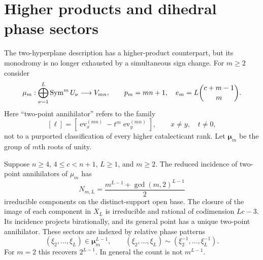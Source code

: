 \section{Higher products and dihedral phase sectors}\label{sec:higher-products}
The two-hyperplane description has a higher-product counterpart, but
its monodromy is no longer exhausted by a simultaneous sign change.
For $m\ge2$ consider
\[
 \mu_m:\bigoplus_{\nu=1}^L\operatorname{Sym}^mU_\nu\longrightarrow V_{mn},
 \qquad p_m=mn+1,\quad e_m=L\binom{c+m-1}{m}.
\]
Here ``two-point annihilator'' refers to the family
\[
 [\ell]=[\operatorname{ev}_x^{(mn)}-t^m\operatorname{ev}_y^{(mn)}],
 \qquad x\ne y,\quad t\ne0,
\]
not to a purported classification of every higher catalecticant rank.
Let $\boldsymbol\mu_m$ be the group of $m$th roots of unity.

\begin{theorem}
\label{thm:higher-phase}
Suppose $n\ge4$, $4\le c<n+1$, $L\ge1$, and $m\ge2$.
The reduced incidence of two-point annihilators of $\mu_m$ has
\begin{equation}\label{eq:dihedral-count}
 N_{m,L}=\frac{m^{L-1}+\gcd(m,2)^{L-1}}2
\end{equation}
irreducible components on the distinct-support open base. The closure
of the image of each component in $X_L$ is irreducible and rational
of codimension $Lc-3$. Its incidence projects birationally, and its
general point has a unique two-point annihilator.
These sectors are indexed by relative phase patterns
\[
 (\xi_2,\ldots,\xi_L)\in\boldsymbol\mu_m^{L-1},
 \qquad (\xi_2,\ldots,\xi_L)\sim
                     (\xi_2^{-1},\ldots,\xi_L^{-1}).
\]
For $m=2$ this recovers $2^{L-1}$. In general the count is not
$m^{L-1}$.
\end{theorem}
